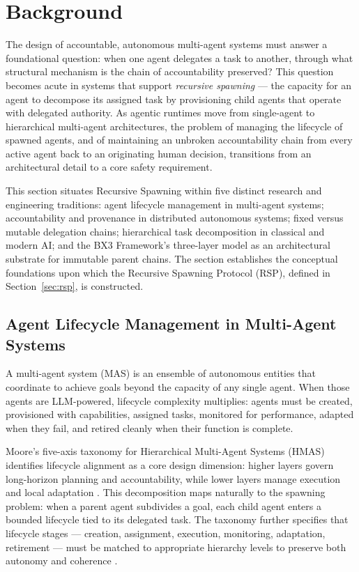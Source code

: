 \section{Background}
\label{sec:background}

The design of accountable, autonomous multi-agent systems must answer a foundational question: when one agent delegates a task to another, through what structural mechanism is the chain of accountability preserved? This question becomes acute in systems that support \emph{recursive spawning} --- the capacity for an agent to decompose its assigned task by provisioning child agents that operate with delegated authority. As agentic runtimes move from single-agent to hierarchical multi-agent architectures, the problem of managing the lifecycle of spawned agents, and of maintaining an unbroken accountability chain from every active agent back to an originating human decision, transitions from an architectural detail to a core safety requirement.

This section situates Recursive Spawning within five distinct research and engineering traditions: agent lifecycle management in multi-agent systems; accountability and provenance in distributed autonomous systems; fixed versus mutable delegation chains; hierarchical task decomposition in classical and modern AI; and the BX3 Framework's three-layer model as an architectural substrate for immutable parent chains. The section establishes the conceptual foundations upon which the Recursive Spawning Protocol (RSP), defined in Section~\ref{sec:rsp}, is constructed.

\subsection{Agent Lifecycle Management in Multi-Agent Systems}

A multi-agent system (MAS) is an ensemble of autonomous entities that coordinate to achieve goals beyond the capacity of any single agent. When those agents are LLM-powered, lifecycle complexity multiplies: agents must be created, provisioned with capabilities, assigned tasks, monitored for performance, adapted when they fail, and retired cleanly when their function is complete.

Moore's five-axis taxonomy for Hierarchical Multi-Agent Systems (HMAS) identifies lifecycle alignment as a core design dimension: higher layers govern long-horizon planning and accountability, while lower layers manage execution and local adaptation \cite{moore2025hmas}. This decomposition maps naturally to the spawning problem: when a parent agent subdivides a goal, each child agent enters a bounded lifecycle tied to its delegated task. The taxonomy further specifies that lifecycle stages --- creation, assignment, execution, monitoring, adaptation, retirement --- must be matched to appropriate hierarchy levels to preserve both autonomy and coherence \cite{moore2025hmas}.

